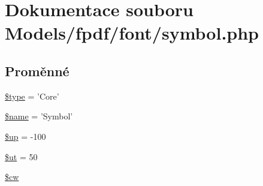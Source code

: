 \hypertarget{symbol_8php}{\section{Dokumentace souboru Models/fpdf/font/symbol.php}
\label{symbol_8php}
}
\subsection*{Proměnné}
\begin{DoxyCompactItemize}
\item 
\hyperlink{symbol_8php_a9a4a6fba2208984cabb3afacadf33919}{\$type} = 'Core'
\item 
\hyperlink{symbol_8php_ab2fc40d43824ea3e1ce5d86dee0d763b}{\$name} = 'Symbol'
\item 
\hyperlink{symbol_8php_a6b5ad2ac55f9df46e8f34e78fbd6f176}{\$up} = -\/100
\item 
\hyperlink{symbol_8php_aadd3f841051043ee58e587e840e8dd0b}{\$ut} = 50
\item 
\hyperlink{symbol_8php_ac2951b03dbb0317e6c61ec920b7479dc}{\$cw}
\end{DoxyCompactItemize}



